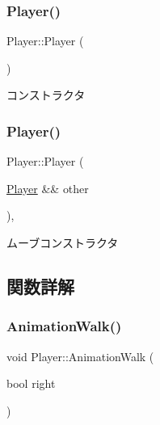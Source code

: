 \subsubsection{\texorpdfstring{Player()}{Player()}\hspace{0.1cm}{\footnotesize\ttfamily [1/2]}}
{\footnotesize\ttfamily Player\+::\+Player (\begin{DoxyParamCaption}{ }\end{DoxyParamCaption})\hspace{0.3cm}{\ttfamily [inline]}}



コンストラクタ 

\mbox{\label{class_player_a635af5e438af5a296c88f768e5e93eb0}} 
\subsubsection{\texorpdfstring{Player()}{Player()}\hspace{0.1cm}{\footnotesize\ttfamily [2/2]}}
{\footnotesize\ttfamily Player\+::\+Player (\begin{DoxyParamCaption}\item[{\mbox{\hyperlink{class_player}{Player}} \&\&}]{other }\end{DoxyParamCaption})\hspace{0.3cm}{\ttfamily [inline]}, {\ttfamily [noexcept]}}



ムーブコンストラクタ 



\subsection{関数詳解}
\mbox{\label{class_player_af1b9f4482efa53508befe6de204a3da6}} 
\subsubsection{\texorpdfstring{Animation\+Walk()}{AnimationWalk()}}
{\footnotesize\ttfamily void Player\+::\+Animation\+Walk (\begin{DoxyParamCaption}\item[{bool}]{right }\end{DoxyParamCaption})\hspace{0.3cm}{\ttfamily [inline]}}



